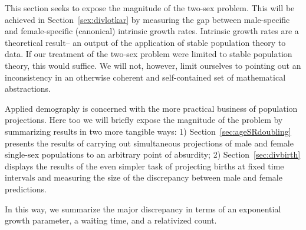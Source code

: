 
This section seeks to expose the magnitude of the two-sex problem. This will be
achieved in Section~\ref{sex:divlotkar} by measuring the gap between
male-specific and female-specific (canonical) intrinsic growth rates. Intrinsic growth rates are a
theoretical result-- an output of the application of stable population 
theory to data. If our treatment of the two-sex problem were limited to 
stable population theory, this would suffice. We will not, however, limit
ourselves to pointing out an inconsistency in an otherwise coherent and
self-contained set of mathematical abstractions. 

Applied demography is concerned with the more practical
business of population projections. Here too we will briefly
expose the magnitude of the problem by summarizing results in two more tangible
ways: 1) Section~\ref{sec:ageSRdoubling} presents the results of carrying out
simultaneous projections of male and female single-sex populations to an 
arbitrary point of absurdity; 2) Section~\ref{sec:divbirth} displays the
results of the even simpler task of projecting births at fixed time intervals
and measuring the size of the discrepancy between male and female predictions.

In this way, we summarize the major discrepancy in terms of an exponential
growth parameter, a waiting time, and a relativized count.

